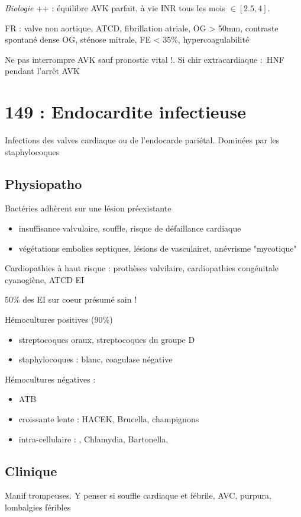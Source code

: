 \textit{Biologie} ++ : équilibre AVK parfait, à vie \thus INR tous les mois $\in
[2.5, 4]$.

FR : valve non aortique, ATCD, fibrillation atriale, \diameter OG > 50mm,
contraste spontané dense OG, sténose mitrale, FE < 35\%, hypercoagulabilité

Ne pas interrompre AVK sauf pronostic vital !. Si chir extracardiaque : HNF
pendant l'arrêt AVK

\section{149 : Endocardite infectieuse}%
\label{sec:149_endocardite_infectieuse}
Infections des valves cardiaque ou de l'endocarde pariétal. Dominées par les
staphylocoques

\subsection{Physiopatho}
Bactéries adhèrent sur une lésion préexistante \thus
\begin{itemize}
  \item insuffisance valvulaire, souffle, risque de défaillance cardiaque
  \item végétations \thus embolies septiques, lésions de vasculairet, anévrisme
    "mycotique"
\end{itemize}

Cardiopathies à haut risque : prothèses valvilaire, cardiopathies congénitale
cyanogiène, ATCD EI

50\% des EI sur coeur présumé sain !

Hémocultures positives (90\%)
\begin{itemize}
  \item streptocoques oraux, streptocoques du groupe D
  \item staphylocoques : blanc, coagulase négative
\end{itemize}
Hémocultures négatives :
\begin{itemize}
   \item ATB
   \item croissante lente : HACEK, Brucella, champignons
   \item intra-cellulaire : , Chlamydia, Bartonella,
\end{itemize}

\subsection{Clinique}
\danger Manif trompeuses. Y penser si souffle cardiaque et fébrile, AVC,
purpura, lombalgies féribles


